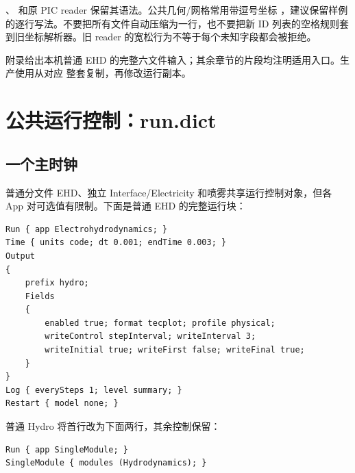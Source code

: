 \documentclass[a4paper,11pt]{article}
\begin{document}
、 和原 PIC reader 保留其语法。公共几何/网格常用带逗号坐标 ，建议保留样例的逐行写法。不要把所有文件自动压缩为一行，也不要把新 ID 列表的空格规则套到旧坐标解析器。旧 reader 的宽松行为不等于每个未知字段都会被拒绝。

附录给出本机普通 EHD 的完整六文件输入；其余章节的片段均注明适用入口。生产使用从对应  整套复制，再修改运行副本。

\section{公共运行控制：run.dict}
\subsection{一个主时钟}
普通分文件 EHD、独立 Interface/Electricity 和喷雾共享运行控制对象，但各 App 对可选值有限制。下面是普通 EHD 的完整运行块：
\begin{lstlisting}
Run { app Electrohydrodynamics; }
Time { units code; dt 0.001; endTime 0.003; }
Output
{
    prefix hydro;
    Fields
    {
        enabled true; format tecplot; profile physical;
        writeControl stepInterval; writeInterval 3;
        writeInitial true; writeFirst false; writeFinal true;
    }
}
Log { everySteps 1; level summary; }
Restart { model none; }
\end{lstlisting}
普通 Hydro 将首行改为下面两行，其余控制保留：
\begin{lstlisting}
Run { app SingleModule; }
SingleModule { modules (Hydrodynamics); }
\end{lstlisting}
\end{document}
